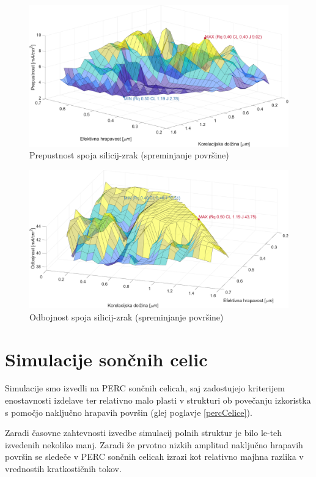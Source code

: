 \documentclass[a4paper,twoside,openright,12pt,slovene]{book}
\begin{document}
\begin{figure}[H]
    \centering
    \includegraphics[width=150mm]{Slike/pre_Si_air.png}
    \caption{Prepustnost spoja silicij-zrak (spreminjanje površine)}
    \label{fig:pre_si_air_v}
\end{figure}

\begin{figure}[H]
    \centering
    \includegraphics[width=150mm]{Slike/odb_Si_air.png}
    \caption{Odbojnost spoja silicij-zrak (spreminjanje površine)}
    \label{fig:odb_si_air_v}
\end{figure}


\section{Simulacije sončnih celic}

Simulacije smo izvedli na PERC sončnih celicah, saj zadostujejo kriterijem enostavnosti izdelave ter relativno malo plasti v strukturi ob povečanju izkoristka s pomočjo naključno hrapavih površin (glej poglavje \ref{percCelice}).

Zaradi časovne zahtevnosti izvedbe simulacij polnih struktur je bilo le-teh izvedenih nekoliko manj. Zaradi že prvotno nizkih amplitud naključno hrapavih površin se sledeče v PERC sončnih celicah izrazi kot relativno majhna razlika v vrednostih kratkostičnih tokov.
\end{document}
